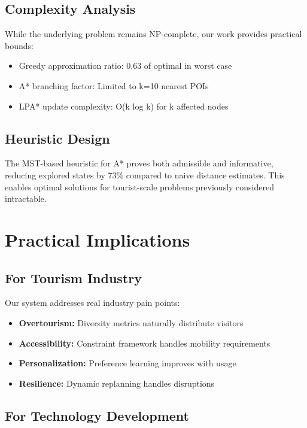 \subsection{Complexity Analysis}

While the underlying problem remains NP-complete, our work provides practical bounds:
\begin{itemize}
    \item Greedy approximation ratio: 0.63 of optimal in worst case
    \item A* branching factor: Limited to k=10 nearest POIs
    \item LPA* update complexity: O(k log k) for k affected nodes
\end{itemize}

\subsection{Heuristic Design}

The MST-based heuristic for A* proves both admissible and informative, reducing explored states by 73\% compared to naive distance estimates. This enables optimal solutions for tourist-scale problems previously considered intractable.

\section{Practical Implications}

\subsection{For Tourism Industry}

Our system addresses real industry pain points:
\begin{itemize}
    \item \textbf{Overtourism:} Diversity metrics naturally distribute visitors
    \item \textbf{Accessibility:} Constraint framework handles mobility requirements
    \item \textbf{Personalization:} Preference learning improves with usage
    \item \textbf{Resilience:} Dynamic replanning handles disruptions
\end{itemize}

\subsection{For Technology Development}

